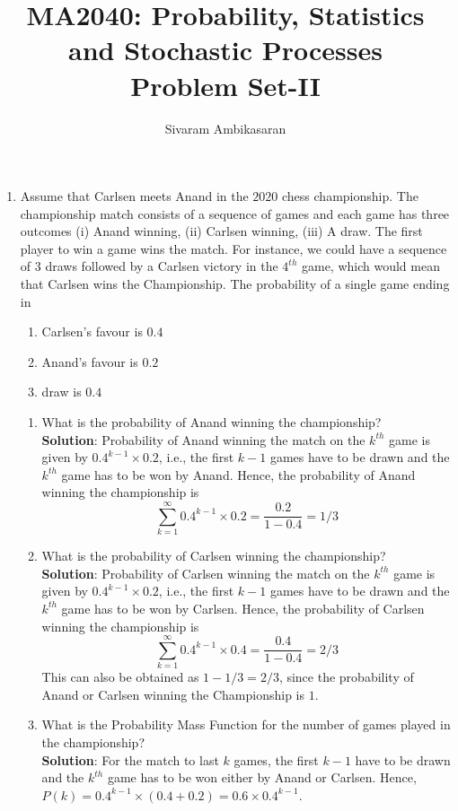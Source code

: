 \documentclass{article}
\title{MA2040: Probability, Statistics and Stochastic Processes\\
Problem Set-II}
\author{Sivaram Ambikasaran}
\newcommand{\dsum}{\displaystyle\sum}
\newcommand{\bkt}[1]{\left(#1\right)}
\newcommand{\soln}[1]{\textbf{Solution}:#1}
\begin{document}
	\maketitle
	\begin{enumerate}
		\item
		Assume that Carlsen meets Anand in the $2020$ chess championship. The championship match consists of a sequence of games and each game has three outcomes (i) Anand winning, (ii) Carlsen winning, (iii) A draw. The first player to win a game wins the match. For instance, we could have a sequence of $3$ draws followed by a Carlsen victory in the $4^{th}$ game, which would mean that Carlsen wins the Championship. The probability of a single game ending in
		\begin{enumerate}
			\item
			Carlsen's favour is $0.4$
			\item
			Anand's favour is $0.2$
			\item
			draw is $0.4$
		\end{enumerate}
		\begin{enumerate}[i]
			\item
			What is the probability of Anand winning the championship?\\
			\soln{
			Probability of Anand winning the match on the $k^{th}$ game is given by $0.4^{k-1} \times 0.2$, i.e., the first $k-1$ games have to be drawn and the $k^{th}$ game has to be won by Anand. Hence, the probability of Anand winning the championship is
			$$\dsum_{k=1}^{\infty} 0.4^{k-1} \times 0.2 = \dfrac{0.2}{1-0.4} = 1/3$$
			}
			\item
			What is the probability of Carlsen winning the championship?\\
			\soln{
			Probability of Carlsen winning the match on the $k^{th}$ game is given by $0.4^{k-1} \times 0.2$, i.e., the first $k-1$ games have to be drawn and the $k^{th}$ game has to be won by Carlsen. Hence, the probability of Carlsen winning the championship is
			$$\dsum_{k=1}^{\infty} 0.4^{k-1} \times 0.4 = \dfrac{0.4}{1-0.4} = 2/3$$
			This can also be obtained as $1-1/3=2/3$, since the probability of Anand or Carlsen winning the Championship is $1$.
			}
			\item
			What is the Probability Mass Function for the number of games played in the championship?\\
			\soln{
			For the match to last $k$ games, the first $k-1$ have to be drawn and the $k^{th}$ game has to be won either by Anand or Carlsen. Hence, $P(k) = 0.4^{k-1}\times\bkt{0.4+0.2} = 0.6 \times 0.4^{k-1}$.
}
\end{enumerate}
\end{enumerate}
\end{document}
